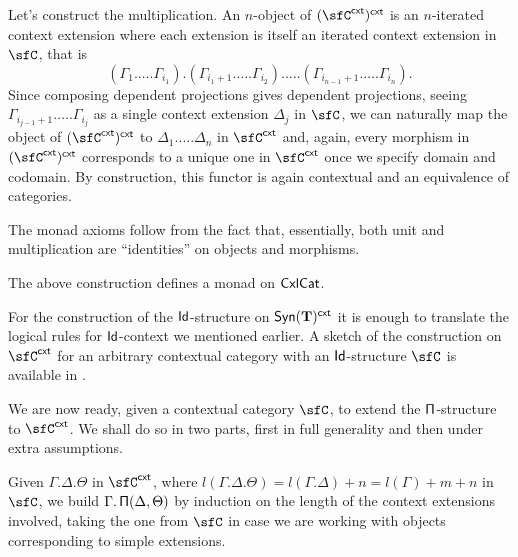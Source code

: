 \begin{construction}
  Let's construct the multiplication. An $n$-object of $(\sfC^{\cxt})^{\cxt}$ is an
  $n$-iterated context extension where each extension is itself an iterated
  context extension in $\sfC$, that is
  \[(\Gamma_1.\ldots.\Gamma_{i_1}).(\Gamma_{i_1+1}.\ldots.\Gamma_{i_2}).\ldots.(\Gamma_{i_{n-1}+1}.\ldots.\Gamma_{i_n}).\]
  Since composing dependent projections gives dependent projections,
  seeing $\Gamma_{i_{j-1}+1}.\ldots.\Gamma_{i_j}$ as a single context extension
  $\Delta_j$ in $\sfC$, we can naturally
  map the object of $(\sfC^{\cxt})^{\cxt}$ to $\Delta_1.\ldots.\Delta_n$ in
  $\sfC^{\cxt}$ and, again, every morphism
  in $(\sfC^{\cxt})^{\cxt}$ corresponds to a unique one in $\sfC^{\cxt}$ once we
  specify domain and codomain. By construction, this functor is again contextual
  and an equivalence of categories.

  The monad axioms follow from the fact that, essentially, both unit and
  multiplication are ``identities'' on objects and morphisms.
\end{construction}

\begin{prop}
  The above construction defines a monad on $\operatorname{\mathsf{CxlCat}}$.
\end{prop}

For the construction of the $\operatorname{\mathsf{Id}}$-structure on $\mathsf{Syn}(\mathbf{T})^{\operatorname{\mathsf{cxt}}}$ it is
enough to translate the logical rules for $\operatorname{\mathsf{Id}}$-context we mentioned earlier. A
sketch of the construction on $\sfC^{\cxt}$ for an
arbitrary contextual category with an $\operatorname{\mathsf{Id}}$-structure $\sfC$ is available in
\cite[Constr.\ 2.17]{KS19}.

We are now ready, given a contextual category $\sfC$, to extend the
$\operatorname{\mathsf{\Pi}}$-structure to $\sfC^{\cxt}$. We shall do so in two parts, first in full
generality and then under extra assumptions.

Given $\Gamma.\Delta.\Theta$ in $\sfC^{\cxt}$, where
$l(\Gamma.\Delta.\Theta)=l(\Gamma.\Delta)+n=l(\Gamma)+m+n$ in $\sfC$, we
build $\Gamma.\operatorname{\mathsf{\Pi}}(\Delta,\Theta)$ by induction on the length of the context
extensions involved, taking the
one from $\sfC$ in case we are working with objects corresponding to simple
extensions.

